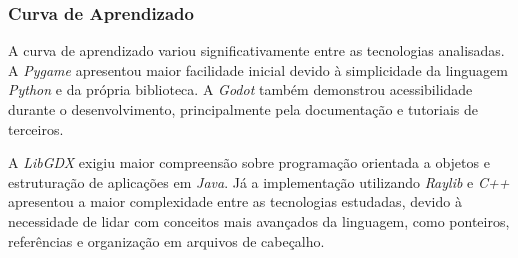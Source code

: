 \subsubsection{Curva de Aprendizado}

A curva de aprendizado variou significativamente entre as tecnologias analisadas. A \textit{Pygame} apresentou maior facilidade inicial devido à simplicidade da linguagem \textit{Python} e da própria biblioteca. A \textit{Godot} também demonstrou acessibilidade durante o desenvolvimento, principalmente pela documentação e tutoriais de terceiros.

A \textit{LibGDX} exigiu maior compreensão sobre programação orientada a objetos e estruturação de aplicações em \textit{Java}. Já a implementação utilizando \textit{Raylib} e \textit{C++} apresentou a maior complexidade entre as tecnologias estudadas, devido à necessidade de lidar com conceitos mais avançados da linguagem, como ponteiros, referências e organização em arquivos de cabeçalho.







